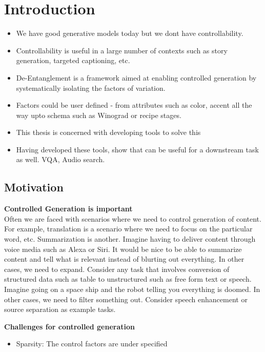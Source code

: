 \chapter{Introduction}


\begin{itemize}
    \item We have good generative models today but we dont have controllability. 
    \item Controllability is useful in a large number of contexts such as story generation, targeted captioning, etc. 
    \item De-Entanglement is a framework aimed at enabling controlled generation by systematically isolating the factors of variation. 
    \item Factors could be user defined - from attributes such as color, accent all the way upto schema such as Winograd or recipe stages.
    \item This thesis is concerned with developing tools to solve this 
    \item Having developed these tools, show  that can be useful for a downstream task as well. VQA, Audio search.

    
\end{itemize}

\section{Motivation}

\textbf{Controlled Generation is important} \\
Often we are faced with scenarios where we need to control generation of content. For example, translation is a scenario where we need to focus on the particular word, etc. Summarization is another. Imagine having to deliver content through voice media such as Alexa or Siri. It would be nice to be able to summarize content and tell what is relevant instead of blurting out everything. In other cases, we need to expand. Consider any task that involves conversion of structured data such as table to unstructured such as free form text or speech. Imagine going on a space ship and the robot telling you everything is doomed. In other cases, we need to filter something out. Consider speech enhancement or source separation as example tasks. 

\textbf{Challenges for controlled generation} 

\begin{itemize}
    \item Sparsity: The control factors are under specified 
    
\end{itemize}

